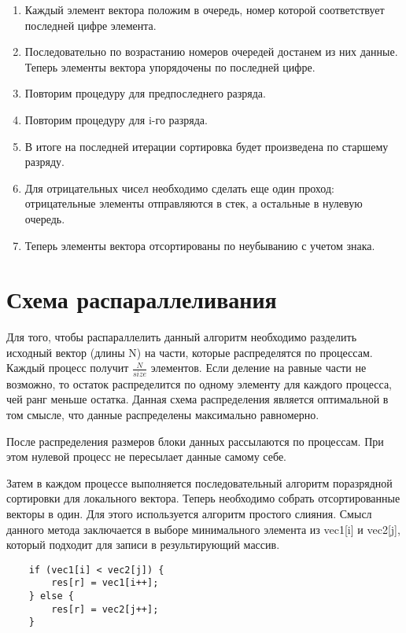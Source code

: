 \documentclass{report}
\begin{document}
    \begin{enumerate}
        \item Каждый элемент вектора положим в очередь, номер которой соответствует последней цифре элемента.
        \item Последовательно по возрастанию номеров очередей достанем из них данные. Теперь элементы вектора упорядочены по последней цифре.
        \item Повторим процедуру для предпоследнего разряда.
        \item Повторим процедуру для i-го разряда.
        \item В итоге на последней итерации сортировка будет произведена по старшему разряду.
        \item Для отрицательных чисел необходимо сделать еще один проход: отрицательные элементы отправляются в стек, а остальные в нулевую очередь.
        \item Теперь элементы вектора отсортированы по неубыванию с учетом знака.
    \end{enumerate}
    
    \newpage
    \section*{Схема распараллеливания}
    
    \par Для того, чтобы распараллелить данный алгоритм необходимо разделить исходный вектор (длины N) на части, которые распределятся по процессам. Каждый процесс получит $\frac{N}{size}$ элементов. Если деление на равные части не возможно, то остаток распределится по одному элементу для каждого процесса, чей ранг меньше остатка. Данная схема распределения является оптимальной в том смысле, что данные распределены максимально равномерно.
    
    \par После распределения размеров блоки данных рассылаются по процессам. При этом нулевой процесс не пересылает данные самому себе.
    
    \par Затем в каждом процессе выполняется последовательный алгоритм поразрядной сортировки для локального вектора. Теперь необходимо собрать отсортированные векторы в один. Для этого используется алгоритм простого слияния. Смысл данного метода заключается в выборе минимального элемента из vec1[i] и vec2[j], который подходит для записи в результирующий массив. 
    \begin{lstlisting}
    if (vec1[i] < vec2[j]) {
        res[r] = vec1[i++];
    } else {
        res[r] = vec2[j++];
    }
    \end{lstlisting}
    
\end{document}
